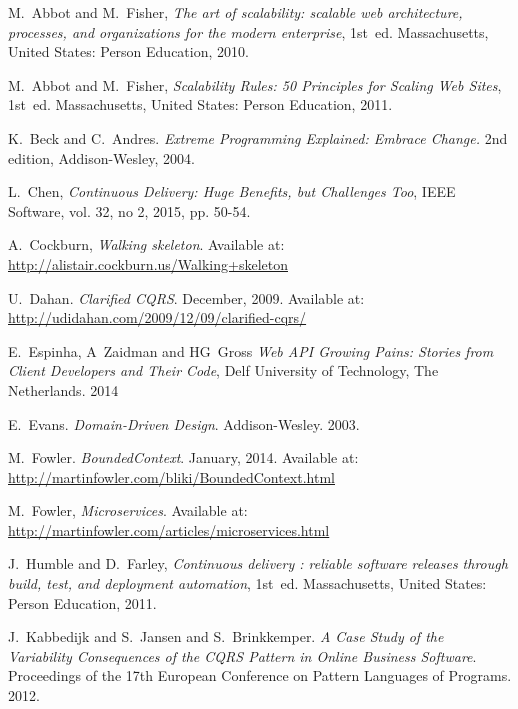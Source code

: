 \documentclass[10pt,article]{IEEEtran}
\begin{document}
\begin{thebibliography}{1}

M.~Abbot and M.~Fisher, \emph{The art of scalability: scalable web architecture, processes, and organizations for the modern enterprise}, 1st~ed. Massachusetts, United States: Person Education, 2010.
  
M.~Abbot and M.~Fisher, \emph{Scalability Rules: 50 Principles for Scaling Web Sites}, 1st~ed. Massachusetts, United States: Person Education, 2011.

K.~Beck and C.~Andres. \emph{Extreme Programming Explained: Embrace Change.} 2nd edition, Addison-Wesley, 2004.

L.~Chen, \emph{Continuous Delivery: Huge Benefits, but Challenges Too}, IEEE Software, vol. 32, no 2, 2015, pp. 50-54.

A.~Cockburn, \emph{Walking skeleton}. Available at: \url{http://alistair.cockburn.us/Walking+skeleton}

U.~Dahan. \emph{Clarified CQRS}. December, 2009. Available at: \href{http://udidahan.com/2009/12/09/clarified-cqrs/}{http://udidahan.com/2009/12/09/clarified-cqrs/}

E.~Espinha, A~Zaidman and HG~Gross \emph{Web API Growing Pains: Stories from Client Developers and Their Code}, Delf University of Technology, The Netherlands. 2014

E.~Evans. \emph{Domain-Driven Design}. Addison-Wesley. 2003.

M.~Fowler. \emph{BoundedContext}. January, 2014. Available at: \href{http://martinfowler.com/bliki/BoundedContext.html}{http://martinfowler.com/bliki/BoundedContext.html}

M.~Fowler, \emph{Microservices}. Available at: \url{http://martinfowler.com/articles/microservices.html}

J.~Humble and D.~Farley, \emph{Continuous delivery : reliable software releases through build, test, and deployment automation}, 1st~ed. Massachusetts, United States: Person Education, 2011.

J.~Kabbedijk and S.~Jansen and S.~Brinkkemper. \emph{A Case Study of the Variability Consequences of the CQRS Pattern in Online Business Software}. Proceedings of the 17th European Conference on Pattern Languages of Programs. 2012.


\end{thebibliography}
\end{document}
